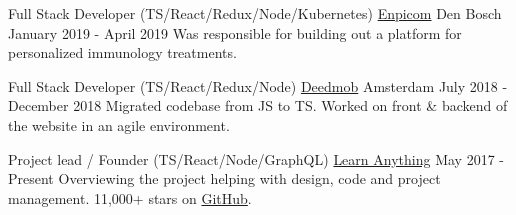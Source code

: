 
\begin{cventries}

  \cventry
    {Full Stack Developer (TS/React/Redux/Node/Kubernetes)}
    {\href{https://www.enpicom.com}{Enpicom}}
    {Den Bosch}
    {January 2019 - April 2019}
    {
      {Was responsible for building out a platform for personalized immunology treatments.}
    }

  \cventry
    {Full Stack Developer (TS/React/Redux/Node)}
    {\href{https://www.deedmob.com}{Deedmob}}
    {Amsterdam}
    {July 2018 - December 2018}
    {
      {Migrated codebase from JS to TS. Worked on front \& backend of the website in an agile environment.}
    }

  \cventry
    {Project lead / Founder (TS/React/Node/GraphQL)}
    {\href{https://learn-anything.xyz}{Learn Anything}}
    {}
    {May 2017 - Present}
    {
      {Overviewing the project helping with design, code and project management. 11,000+ stars on \href{https://github.com/learn-anything/learn-anything}{GitHub}.}
    }

\end{cventries}

